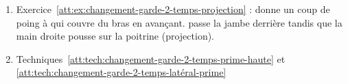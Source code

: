 \begin{enumerate}
	\item Exercice~\ref{att:ex:changement-garde-2-temps-projection} : \A donne un coup de poing à \D qui couvre du bras en avançant.
	\D passe la jambe derrière \D tandis que la main droite pousse sur la poitrine (projection).
	
	\item Techniques~\ref{att:tech:changement-garde-2-temps-prime-haute} et \ref{att:tech:changement-garde-2-temps-latéral-prime}
\end{enumerate}

